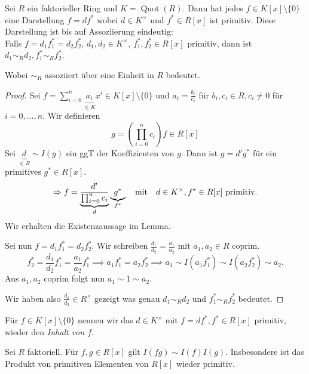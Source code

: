 \begin{lemma}
	Sei $R$ ein faktorieller Ring und $K = \operatorname{Quot}(R)$.
	Dann hat jedes  $f \in K[x] \setminus \{0\} $ eine Darstellung $f = d f^{*}$ 
	wobei $d \in K^{\times}$ und $f^{*} \in R[x]$ ist primitiv.
	Diese Darstellung ist bis auf Assoziierung eindeutig:\\
	Falls $f = d_1 f_1^{*} = d_2 f_2^{*}$, $d_1,d_2 \in K^{\times}$,
	$f_1^{*},f_2^{*} \in R[x]$ primitiv, dann ist $d_1 \sim_{R} d_2, f_1^{*} \sim_{R} f_2^{*}$.
	
	Wobei $\sim_{R}$  assoziiert über eine Einheit in $R$ bedeutet.
\end{lemma}

\begin{proof}
	Sei $f = \sum_{i=0}^{n} \underbrace{a_{i}}_{\in K} x^{i} \in K[x] \setminus \{0\} $ und $a_{i} = \frac{b_{i}}{c_{i}}$ für $b_{i},c_{i} \in R, c_{i} \neq 0$ für $i = 0,\ldots,n$.
	Wir definieren 
	 \[
		 g = \left( \prod_{i=0}^{n} c_{i} \right) f \in R[x]
	\] 
	Sei $\underbrace{d}_{\in R} \sim I(g)$ ein ggT der Koeffizienten von $g$.
	Dann ist $g = d' g^{*}$ für ein primitives $g^{*} \in R[x]$.
	\[
		\implies f = \underbrace{\frac{d'}{\prod_{i=0}^{n} c_{i}}}_{d} \underbrace{g^{*}}_{f^{*}} \qq{mit} d \in K^{\times }, f^{*} \in R[x] \text{ primitiv}
	.\] 
	Wir erhalten die Existenzaussage im Lemma.

	Sei nun $f = d_1 f_1^{*} = d_2 f_2^{*}$.
	Wir schreiben $\frac{d_1}{d_2} = \frac{a_1}{a_2}$ mit $a_1,a_2 \in R$ coprim.
	\[
		f_2^{*} = \frac{d_1}{d_2} f_1^{*} = \frac{a_1}{a_2} f_1^{*} \implies a_1 f_1^{*} = a_2 f_2^{*} \implies a_1 \sim I(a_1 f_1^{*}) \sim I(a_2 f_2^{*}) \sim a_2
	.\]
	Aus $a_1,a_2$ coprim folgt nun $a_1 \sim 1 \sim a_2$.

	Wir haben also $\frac{d_1}{d_2} \in R^{\times}$ gezeigt was genau $d_1 \sim_{R} d_2$ und $f_1^{*} \sim_{R} f_2^{*}$ bedeutet.
\end{proof}

\begin{definition}
	Für $f \in K[x] \setminus \{0\} $ nennen wir das $d \in K^{\times}$ mit $f = d f^{*}, f^{*} \in R[x]$ primitiv, wieder den \emph{Inhalt von $f$}.
\end{definition}

\begin{proposition}[Gauss]
	Sei $R$ faktoriell. Für $f,g \in R[x]$ gilt $I(fg) \sim I(f) I(g)$.
	Insbesondere ist das Produkt von primitiven Elementen von $R[x]$ wieder primitiv.
\end{proposition}

